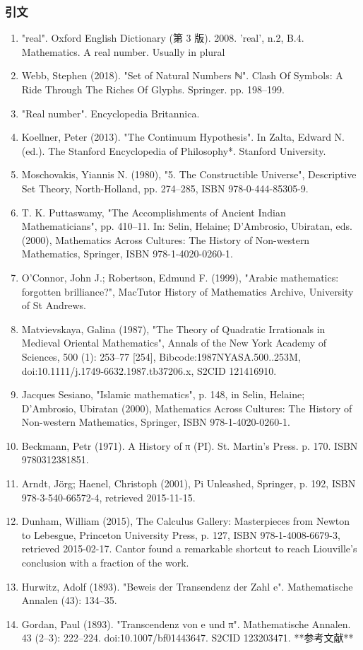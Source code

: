 \subsubsection{引文}
\begin{enumerate}
\item "real". Oxford English Dictionary (第 3 版). 2008. 'real', n.2, B.4. Mathematics. A real number. Usually in plural
\item Webb, Stephen (2018). "Set of Natural Numbers ℕ". Clash Of Symbols: A Ride Through The Riches Of Glyphs. Springer. pp. 198–199.
\item "Real number". Encyclopedia Britannica.
\item Koellner, Peter (2013). "The Continuum Hypothesis". In Zalta, Edward N. (ed.). The Stanford Encyclopedia of Philosophy*. Stanford University.
\item Moschovakis, Yiannis N. (1980), "5. The Constructible Universe", Descriptive Set Theory, North-Holland, pp. 274–285, ISBN 978-0-444-85305-9.
\item T. K. Puttaswamy, "The Accomplishments of Ancient Indian Mathematicians", pp. 410–11. In: Selin, Helaine; D'Ambrosio, Ubiratan, eds. (2000), Mathematics Across Cultures: The History of Non-western Mathematics, Springer, ISBN 978-1-4020-0260-1.
\item O'Connor, John J.; Robertson, Edmund F. (1999), "Arabic mathematics: forgotten brilliance?", MacTutor History of Mathematics Archive, University of St Andrews.
\item Matvievskaya, Galina (1987), "The Theory of Quadratic Irrationals in Medieval Oriental Mathematics", Annals of the New York Academy of Sciences, 500 (1): 253–77 [254], Bibcode:1987NYASA.500..253M, doi:10.1111/j.1749-6632.1987.tb37206.x, S2CID 121416910.
\item Jacques Sesiano, "Islamic mathematics", p. 148, in Selin, Helaine; D'Ambrosio, Ubiratan (2000), Mathematics Across Cultures: The History of Non-western Mathematics, Springer, ISBN 978-1-4020-0260-1.
\item Beckmann, Petr (1971). A History of π (PI). St. Martin's Press. p. 170. ISBN 9780312381851.
\item Arndt, Jörg; Haenel, Christoph (2001), Pi Unleashed, Springer, p. 192, ISBN 978-3-540-66572-4, retrieved 2015-11-15.
\item Dunham, William (2015), The Calculus Gallery: Masterpieces from Newton to Lebesgue, Princeton University Press, p. 127, ISBN 978-1-4008-6679-3, retrieved 2015-02-17. Cantor found a remarkable shortcut to reach Liouville's conclusion with a fraction of the work.
\item Hurwitz, Adolf (1893). "Beweis der Transendenz der Zahl e". Mathematische Annalen (43): 134–35.
\item Gordan, Paul (1893). "Transcendenz von e und π". Mathematische Annalen. 43 (2–3): 222–224. doi:10.1007/bf01443647. S2CID 123203471.
**参考文献**


\end{enumerate}
